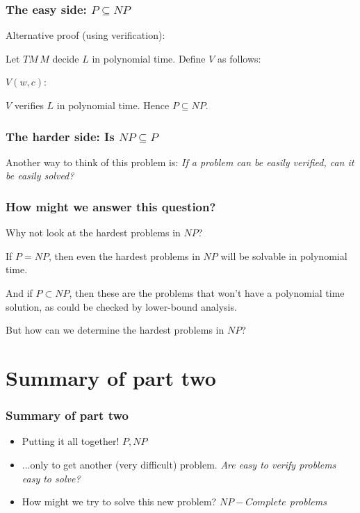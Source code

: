 \documentclass[aspectratio=169]{beamer}
\begin{document}
\begin{frame}
\frametitle{The easy side: $P \subseteq NP$}

Alternative proof (using verification):

Let $TM\, M$ decide $L$ in polynomial time. Define $V$ as follows:

\begin{algorithm}[H]
$V(w, c):$\\
\end{algorithm}

$V$ verifies $L$ in polynomial time. Hence $P \subseteq NP$.
\end{frame}

\begin{frame}
\frametitle{The harder side: Is $NP \subseteq P$}

Another way to think of this problem is: {\em If a problem can be easily verified, can it be easily solved?}
\end{frame}

\begin{frame}
\frametitle{How might we answer this question?}

Why not look at the hardest problems in $NP$?

If $P = NP$, then even the hardest problems in $NP$ will be solvable in polynomial time.

And if $P \subset NP$, then these are the problems that won't have a polynomial time solution, as could be checked by lower-bound analysis.

But how can we determine the hardest problems in $NP$?
\end{frame}

\section{Summary of part two}

\begin{frame}
\frametitle{Summary of part two}
\begin{itemize}
    \item Putting it all together! {\em $P, NP$}
    \item ...only to get another (very difficult) problem. {\em Are easy to verify problems easy to solve?}
    \item How might we try to solve this new problem? {\em $NP-Complete$ problems}
\end{itemize}
\end{frame}
\end{document}
